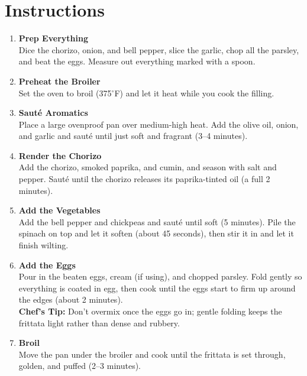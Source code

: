 \newpage
{}
\section*{Instructions}

\begin{enumerate}

      \item \textbf{Prep Everything} \\
            Dice the chorizo, onion, and bell pepper, slice the garlic, chop all the parsley, and beat the eggs. Measure out everything marked with a spoon.

      \item \textbf{Preheat the Broiler} \\
            Set the oven to broil (375$^\circ$F) and let it heat while you cook the filling.

      \item \textbf{Sauté Aromatics} \\
            Place a large ovenproof pan over medium-high heat. Add the olive oil, onion, and garlic and sauté until just soft and fragrant (3--4 minutes).

      \item \textbf{Render the Chorizo} \\
            Add the chorizo, smoked paprika, and cumin, and season with salt and pepper. Sauté until the chorizo releases its paprika-tinted oil (a full 2 minutes).

      \item \textbf{Add the Vegetables} \\
            Add the bell pepper and chickpeas and sauté until soft (5 minutes). Pile the spinach on top and let it soften (about 45 seconds), then stir it in and let it finish wilting.

      \item \textbf{Add the Eggs} \\
            Pour in the beaten eggs, cream (if using), and chopped parsley. Fold gently so everything is coated in egg, then cook until the eggs start to firm up around the edges (about 2 minutes). \\
            \textbf{Chef's Tip:} Don't overmix once the eggs go in; gentle folding keeps the frittata light rather than dense and rubbery.

      \item \textbf{Broil} \\
            Move the pan under the broiler and cook until the frittata is set through, golden, and puffed (2--3 minutes).


\end{enumerate}
